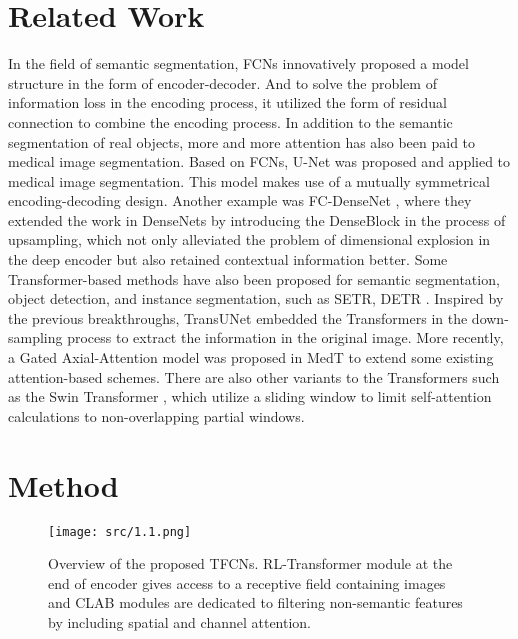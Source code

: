 \documentclass[runningheads]{llncs}
\begin{document}
\section{Related Work}
\label{sec2}
In the field of semantic segmentation, FCNs \cite{long2015fully} innovatively proposed a model structure in the form of encoder-decoder. And to solve the problem of information loss in the encoding process, it utilized the form of residual connection to combine the encoding process. In addition to the semantic segmentation of real objects, more and more attention has also been paid to medical image segmentation. Based on FCNs,  U-Net \cite{ronneberger2015u} was proposed and applied to medical image segmentation. This model makes use of a mutually symmetrical encoding-decoding design. Another example was FC-DenseNet \cite{jegou2017one}, where they extended the work in DenseNets \cite{iandola2014densenet} by introducing the DenseBlock in the process of upsampling, which not only alleviated the problem of dimensional explosion in the deep encoder but also retained contextual information better. Some Transformer-based methods have also been proposed for semantic segmentation, object detection, and instance segmentation, such as SETR, DETR \cite{zheng2021rethinking,carion2020end}. Inspired by the previous breakthroughs, TransUNet \cite{chen2021transunet} embedded the Transformers in the down-sampling process to extract the information in the original image. More recently, a Gated Axial-Attention model was proposed in MedT \cite{valanarasu2021medical} to extend some existing attention-based schemes. There are also other variants to the Transformers such as the Swin Transformer \cite{liu2021swin}, which utilize a sliding window to limit self-attention calculations to non-overlapping partial windows.




\section{Method}
\label{sec3}

\begin{figure*}
\centerline{\texttt{[image: src/1.1.png]}}
\caption{Overview of the proposed TFCNs. RL-Transformer module at the end of encoder gives access to a receptive field containing images and CLAB modules are dedicated to filtering non-semantic features by including spatial and channel attention.}
\label{fig2}
\end{figure*}
\end{document}
